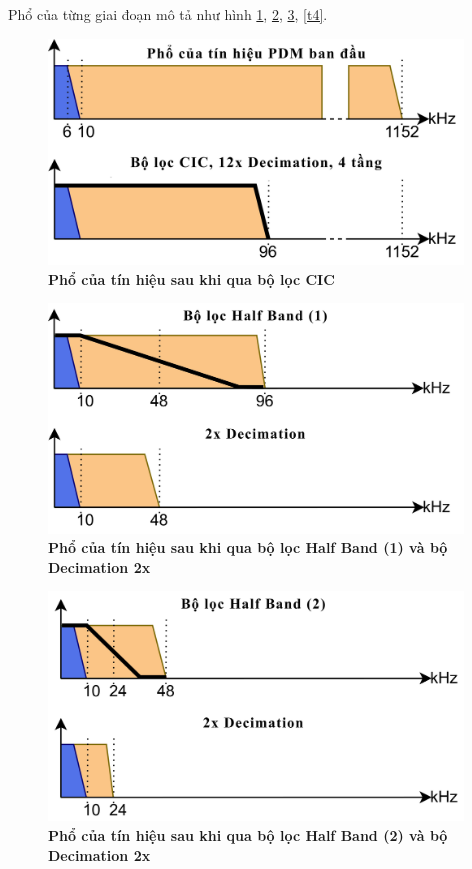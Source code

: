  \noindent Phổ của từng giai đoạn mô tả như hình 
 \ref{t1}, \ref{t2}, \ref{t3}, \ref{t4}.
 \vspace{2.3cm}
 \begin{figure}[H]
    \centering
    \includegraphics[width=11cm]{Images/Chuong3/1.png}
    \caption[Phổ của tín hiệu sau khi qua bộ lọc CIC]{\bfseries \fontsize{12pt}{0pt}\selectfont Phổ của tín hiệu sau khi qua bộ lọc CIC}
    \label{t1}
\end{figure}
\begin{figure}[H]
    \centering
    \includegraphics[width=11cm]{Images/Chuong3/2.png}
    \caption[Phổ của tín hiệu sau khi qua bộ lọc Half Band (1) và bộ Decimation 2x]{\bfseries \fontsize{12pt}{0pt}\selectfont Phổ của tín hiệu sau khi qua bộ lọc Half Band (1) và bộ Decimation 2x}
    \label{t2}
\end{figure}
\begin{figure}[H]
    \centering
    \includegraphics[width=11cm]{Images/Chuong3/3.png}
    \caption[Phổ của tín hiệu sau khi qua bộ lọc Half Band (2) và bộ Decimation 2x]{\bfseries \fontsize{12pt}{0pt}\selectfont Phổ của tín hiệu sau khi qua bộ lọc Half Band (2) và bộ Decimation 2x}
    \label{t3}
\end{figure}
